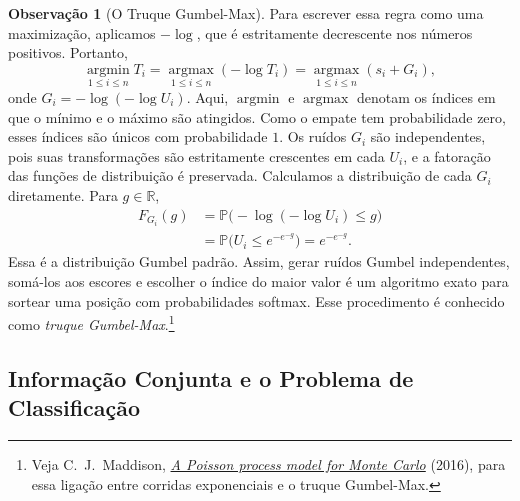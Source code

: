 \documentclass[12pt,portuguese]{article}
\theoremstyle{definition}
\newtheorem{remark}[remark]{Observação}
\theoremstyle{plainexercise}
\theoremstyle{starredexercise}
\theoremstyle{definition}
\begin{document}
\begin{remark}[O Truque Gumbel-Max]
Para escrever essa regra como uma maximização, aplicamos $-\log$, que é
estritamente decrescente nos números positivos. Portanto,
\[
  \operatorname*{argmin}_{1\leqslant i\leqslant n}T_i
  =\operatorname*{argmax}_{1\leqslant i\leqslant n}(-\log T_i)
  =\operatorname*{argmax}_{1\leqslant i\leqslant n}(s_i+G_i),
\]
onde $G_i=-\log(-\log U_i)$. Aqui, $\operatorname*{argmin}$ e
$\operatorname*{argmax}$ denotam os índices em que o mínimo e o máximo
são atingidos. Como o empate tem probabilidade zero, esses índices são
únicos com probabilidade $1$. Os ruídos $G_i$ são independentes, pois
suas transformações são estritamente crescentes em cada $U_i$, e a
fatoração das funções de distribuição é preservada.
Calculamos a distribuição de cada $G_i$ diretamente. Para $g\in\mathbb{R}$,
\begin{align*}
  F_{G_i}(g)
  &=\mathbb{P}\bigl(-\log(-\log U_i)\leqslant g\bigr)
  \\[0.2cm]
  &=\mathbb{P}\bigl(U_i\leqslant e^{-e^{-g}}\bigr)
  =e^{-e^{-g}}.
\end{align*}
Essa é a distribuição Gumbel padrão. Assim, gerar ruídos Gumbel independentes,
somá-los aos escores e escolher o índice do maior valor é um algoritmo exato
para sortear uma posição com probabilidades softmax. Esse procedimento é
conhecido como \emph{truque Gumbel-Max}.\footnote{Veja C.~J.~Maddison,
\href{https://arxiv.org/abs/1602.05986}{\emph{A Poisson process model for
Monte Carlo}} (2016), para essa ligação entre corridas exponenciais
e o truque Gumbel-Max.}
\end{remark}

\subsection{Informação Conjunta e o Problema de Classificação}\label{subsec:classificacao-informacao-conjunta}
\end{document}
